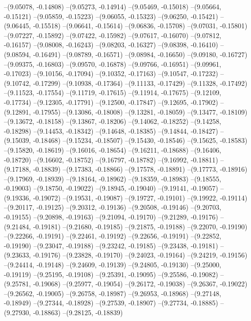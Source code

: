 --(9.05078, -0.14808)
--(9.05273, -0.14914)
--(9.05469, -0.15018)
--(9.05664, -0.15121)
--(9.05859, -0.15223)
--(9.06055, -0.15323)
--(9.06250, -0.15421)
--(9.06445, -0.15518)
--(9.06641, -0.15614)
--(9.06836, -0.15708)
--(9.07031, -0.15801)
--(9.07227, -0.15892)
--(9.07422, -0.15982)
--(9.07617, -0.16070)
--(9.07812, -0.16157)
--(9.08008, -0.16243)
--(9.08203, -0.16327)
--(9.08398, -0.16410)
--(9.08594, -0.16491)
--(9.08789, -0.16571)
--(9.08984, -0.16650)
--(9.09180, -0.16727)
--(9.09375, -0.16803)
--(9.09570, -0.16878)
--(9.09766, -0.16951)
--(9.09961, -0.17023)
--(9.10156, -0.17094)
--(9.10352, -0.17163)
--(9.10547, -0.17232)
--(9.10742, -0.17299)
--(9.10938, -0.17364)
--(9.11133, -0.17429)
--(9.11328, -0.17492)
--(9.11523, -0.17554)
--(9.11719, -0.17615)
--(9.11914, -0.17675)
--(9.12109, -0.17734)
--(9.12305, -0.17791)
--(9.12500, -0.17847)
--(9.12695, -0.17902)
--(9.12891, -0.17955)
--(9.13086, -0.18008)
--(9.13281, -0.18059)
--(9.13477, -0.18109)
--(9.13672, -0.18158)
--(9.13867, -0.18206)
--(9.14062, -0.18252)
--(9.14258, -0.18298)
--(9.14453, -0.18342)
--(9.14648, -0.18385)
--(9.14844, -0.18427)
--(9.15039, -0.18468)
--(9.15234, -0.18507)
--(9.15430, -0.18546)
--(9.15625, -0.18583)
--(9.15820, -0.18619)
--(9.16016, -0.18654)
--(9.16211, -0.18688)
--(9.16406, -0.18720)
--(9.16602, -0.18752)
--(9.16797, -0.18782)
--(9.16992, -0.18811)
--(9.17188, -0.18839)
--(9.17383, -0.18866)
--(9.17578, -0.18891)
--(9.17773, -0.18916)
--(9.17969, -0.18939)
--(9.18164, -0.18962)
--(9.18359, -0.18983)
--(9.18555, -0.19003)
--(9.18750, -0.19022)
--(9.18945, -0.19040)
--(9.19141, -0.19057)
--(9.19336, -0.19072)
--(9.19531, -0.19087)
--(9.19727, -0.19101)
--(9.19922, -0.19114)
--(9.20117, -0.19125)
--(9.20312, -0.19136)
--(9.20508, -0.19146)
--(9.20703, -0.19155)
--(9.20898, -0.19163)
--(9.21094, -0.19170)
--(9.21289, -0.19176)
--(9.21484, -0.19181)
--(9.21680, -0.19185)
--(9.21875, -0.19188)
--(9.22070, -0.19190)
--(9.22266, -0.19191)
--(9.22461, -0.19192)
--(9.22656, -0.19191)
--(9.22852, -0.19190)
--(9.23047, -0.19188)
--(9.23242, -0.19185)
--(9.23438, -0.19181)
--(9.23633, -0.19176)
--(9.23828, -0.19170)
--(9.24023, -0.19164)
--(9.24219, -0.19156)
--(9.24414, -0.19148)
--(9.24609, -0.19139)
--(9.24805, -0.19130)
--(9.25000, -0.19119)
--(9.25195, -0.19108)
--(9.25391, -0.19095)
--(9.25586, -0.19082)
--(9.25781, -0.19068)
--(9.25977, -0.19054)
--(9.26172, -0.19038)
--(9.26367, -0.19022)
--(9.26562, -0.19005)
--(9.26758, -0.18987)
--(9.26953, -0.18968)
--(9.27148, -0.18949)
--(9.27344, -0.18928)
--(9.27539, -0.18907)
--(9.27734, -0.18885)
--(9.27930, -0.18863)
--(9.28125, -0.18839)
